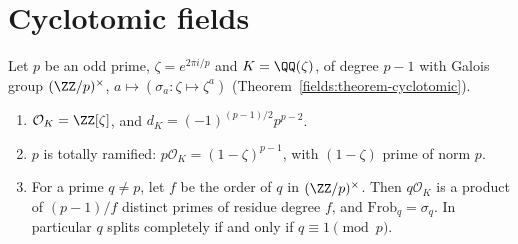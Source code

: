 \section{Cyclotomic fields}\label{algebraic-number-theory:section-cyclotomic-fields}

Let $p$ be an odd prime, $\zeta = e^{2\pi i/p}$ and $K = \QQ(\zeta)$, of degree $p - 1$ with Galois group $(\ZZ/p)^\times$, $a \mapsto (\sigma_a \colon \zeta \mapsto \zeta^a)$
(Theorem~\ref{fields:theorem-cyclotomic}).

\begin{theorem}\label{algebraic-number-theory:theorem-cyclotomic-integers}
\begin{enumerate}
\item $\mathcal{O}_K = \ZZ[\zeta]$, and $d_K = (-1)^{(p-1)/2}p^{p-2}$.
\item $p$ is totally ramified: $p\mathcal{O}_K = (1 - \zeta)^{p-1}$, with $(1 - \zeta)$ prime of norm $p$.
\item For a prime $q \neq p$, let $f$ be the order of $q$ in $(\ZZ/p)^\times$. Then $q\mathcal{O}_K$ is a product of $(p - 1)/f$ distinct primes of residue degree $f$, and $\mathrm{Frob}_q = \sigma_q$. In
particular $q$ splits completely if and only if $q \equiv 1 \pmod p$.
\end{enumerate}
\end{theorem}

